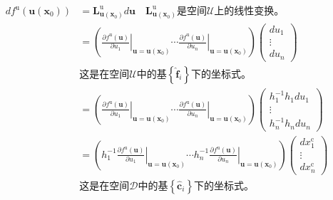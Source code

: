 \documentclass[main.tex]{subfiles}
\begin{document}
\begin{align*}
    df^\mathrm{u}\left(\mathbf{u}\left(\mathbf{x}_0\right)\right) & =\mathbf{L}_{\mathbf{u}\left(\mathbf{x}_0\right)}^\mathrm{u}d\mathbf{u}\quad\text{$\mathbf{L}_{\mathbf{u}\left(\mathbf{x}_0\right)}^\mathrm{u}$是空间$\mathcal{U}$上的线性变换。}                                                                                                                                                                                                             \\
                                                                  & =\left(\left.\frac{\partial f^\mathrm{u}\left(\mathbf{u}\right)}{\partial u_1}\right|_{\mathbf{u}=\mathbf{u}\left(\mathbf{x}_0\right)}\cdots\left.\frac{\partial f^\mathrm{u}\left(\mathbf{u}\right)}{\partial u_n}\right|_{\mathbf{u}=\mathbf{u}\left(\mathbf{x}_0\right)}\right)\left(\begin{array}{c}du_1\\\vdots\\du_n\end{array}\right)                                        \\
                                                                  & \text{这是在空间$\mathcal{U}$中的基$\left\{\mathbf{\hat{f}}_i\right\}$下的坐标式。}                                                                                                                                                                                                                                                                                                               \\
                                                                  & =\left(\left.\frac{\partial f^\mathrm{u}\left(\mathbf{u}\right)}{\partial u_1}\right|_{\mathbf{u}=\mathbf{u}\left(\mathbf{x}_0\right)}\cdots\left.\frac{\partial f^\mathrm{u}\left(\mathbf{u}\right)}{\partial u_n}\right|_{\mathbf{u}=\mathbf{u}\left(\mathbf{x}_0\right)}\right)\left(\begin{array}{c}h_1^{-1}h_1du_1\\\vdots\\h_n^{-1}h_ndu_n\end{array}\right)                  \\
                                                                  & =\left(h_1^{-1}\left.\frac{\partial f^\mathrm{u}\left(\mathbf{u}\right)}{\partial u_1}\right|_{\mathbf{u}=\mathbf{u}\left(\mathbf{x}_0\right)}\cdots h_n^{-1}\left.\frac{\partial f^\mathrm{u}\left(\mathbf{u}\right)}{\partial u_n}\right|_{\mathbf{u}=\mathbf{u}\left(\mathbf{x}_0\right)}\right)\left(\begin{array}{c}dx_1^\mathrm{c}\\\vdots\\dx_n^\mathrm{c}\end{array}\right) \\
                                                                  & \text{这是在空间$\mathcal{D}$中的基$\left\{\mathbf{\hat{c}}_i\right\}$下的坐标式。}
\end{align*}
\end{document}
